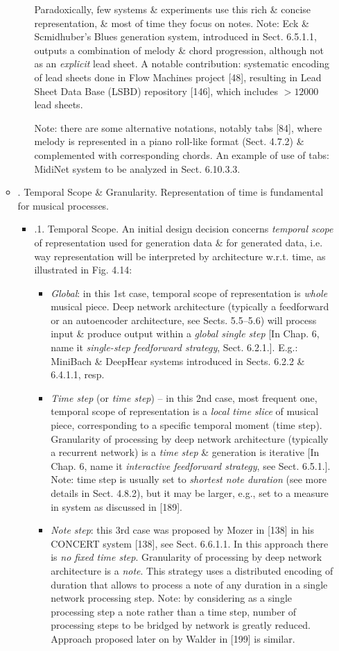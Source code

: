 \documentclass{article}
\begin{document}
\begin{itemize}
\begin{itemize}
\begin{itemize}
			Paradoxically, few systems \& experiments use this rich \& concise representation, \& most of time they focus on notes. Note: {\sc Eck \& Scmidhuber}'s Blues generation system, introduced in Sect. 6.5.1.1, outputs a combination of melody \& chord progression, although not as an {\it explicit} lead sheet. A notable contribution: systematic encoding of lead sheets done in Flow Machines project [48], resulting in Lead Sheet Data Base (LSBD) repository [146], which includes $> 12000$ lead sheets.

			Note: there are some alternative notations, notably tabs [84], where melody is represented in a piano roll-like format (Sect. 4.7.2) \& complemented with corresponding chords. An example of use of tabs: MidiNet system to be analyzed in Sect. 6.10.3.3.
		\end{itemize}
		\item {. Temporal Scope \& Granularity.} Representation of time is fundamental for musical processes.
		\begin{itemize}
			\item {.1. Temporal Scope.} An initial design decision concerns {\it temporal scope} of representation used for generation data \& for generated data, i.e. way representation will be interpreted by architecture w.r.t. time, as illustrated in {\sf Fig. 4.14}:
			\begin{itemize}
				\item {\it Global}: in this 1st case, temporal scope of representation is {\it whole} musical piece. Deep network architecture (typically a feedforward or an autoencoder architecture, see Sects. 5.5--5.6) will process input \& produce output within a {\it global single step} [In Chap. 6, name it {\it single-step feedforward strategy}, Sect. 6.2.1.]. E.g.: MiniBach \& DeepHear systems introduced in Sects. 6.2.2 \& 6.4.1.1, resp.
				\item {\it Time step} (or {\it time step}) -- in this 2nd case, most frequent one, temporal scope of representation is a {\it local time slice} of musical piece, corresponding to a specific temporal moment (time step). Granularity of processing by deep network architecture (typically a recurrent network) is a {\it time step} \& generation is iterative [In Chap. 6, name it {\it interactive feedforward strategy}, see Sect. 6.5.1.]. Note: time step is usually set to {\it shortest note duration} (see more details in Sect. 4.8.2), but it may be larger, e.g., set to a measure in system as discussed in [189].
				\item {\it Note step}: this 3rd case was proposed by {\sc Mozer} in [138] in his CONCERT system [138], see Sect. 6.6.1.1. In this approach there is {\it no fixed time step}. Granularity of processing by deep network architecture is a {\it note}. This strategy uses a distributed encoding of duration that allows to process a note of any duration in a single network processing step. Note: by considering as a single processing step a note rather than a time step, number of processing steps to be bridged by network is greatly reduced. Approach proposed later on by {\sc Walder} in [199] is similar.


\end{itemize}
\end{itemize}
\end{itemize}
\end{itemize}
\end{document}
